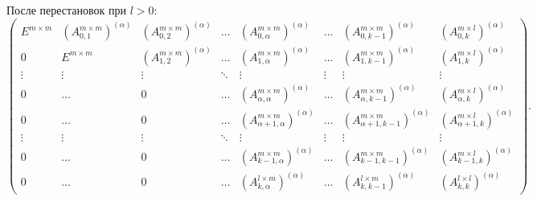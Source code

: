 \documentclass[a4paper,12pt]{article}
\newcommand{\br}[1]{\left(#1\right)}
\begin{document}
После перестановок при $l > 0$:
\[
    \begin{pmatrix}
        E^{m \times m} & \br{A_{0, 1}^{m \times m}}^{(\alpha)} & \br{A_{0, 2}^{m \times m}}^{(\alpha)} & \dots  & \br{A_{0, \alpha}^{m \times m}}^{(\alpha)}          & \dots  & \br{A_{0, k - 1}^{m \times m}}^{(\alpha)}          & \br{A_{0, k}^{m \times l}}^{(\alpha)}          \\
        0              & E^{m \times m}                        & \br{A_{1, 2}^{m \times m}}^{(\alpha)} & \dots  & \br{A_{1, \alpha}^{m \times m}}^{(\alpha)}          & \dots  & \br{A_{1, k - 1}^{m \times m}}^{(\alpha)}          & \br{A_{1, k}^{m \times l}}^{(\alpha)}          \\
        \vdots         & \vdots                                & \vdots                                & \ddots & \vdots                                              & \vdots & \vdots                                             & \vdots                                         \\
        0              & \dots                                 & 0                                     & \dots  & \br{A_{\alpha, \alpha}^{m \times m}}^{(\alpha)}     & \dots  & \br{A_{\alpha, k - 1}^{m \times m}}^{(\alpha)}     & \br{A_{\alpha, k}^{m \times l}}^{(\alpha)}     \\
        0              & \dots                                 & 0                                     & \dots  & \br{A_{\alpha + 1, \alpha}^{m \times m}}^{(\alpha)} & \dots  & \br{A_{\alpha + 1, k - 1}^{m \times m}}^{(\alpha)} & \br{A_{\alpha + 1, k}^{m \times l}}^{(\alpha)} \\
        \vdots         & \vdots                                & \vdots                                & \ddots & \vdots                                              & \vdots & \vdots                                             & \vdots                                         \\
        0              & \dots                                 & 0                                     & \dots  & \br{A_{k - 1, \alpha}^{m \times m}}^{(\alpha)}      & \dots  & \br{A_{k - 1, k - 1}^{m \times m}}^{(\alpha)}      & \br{A_{k - 1, k}^{m \times l}}^{(\alpha)}      \\
        0              & \dots                                 & 0                                     & \dots  & \br{A_{k, \alpha}^{l \times m}}^{(\alpha)}          & \dots  & \br{A_{k, k - 1}^{l \times m}}^{(\alpha)}          & \br{A_{k, k}^{l \times l}}^{(\alpha)}
    \end{pmatrix}.
\]
\end{document}
